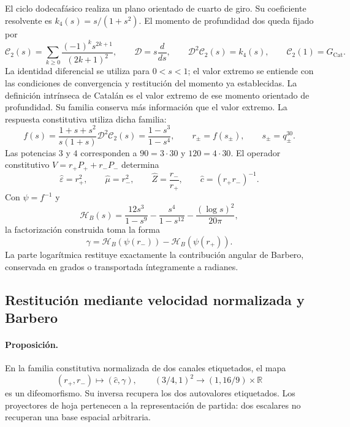 El ciclo dodecafásico realiza un plano orientado de cuarto de giro. Su
coeficiente resolvente es $k_4(s)=s/(1+s^2)$. El momento de profundidad dos
queda fijado por
\begin{equation}
 \mathcal C_2(s)=\sum_{k\geq0}
 \frac{(-1)^ks^{2k+1}}{(2k+1)^2},\qquad
 \mathcal D=s\frac{d}{ds},\qquad
 \mathcal D^2\mathcal C_2(s)=k_4(s),\qquad
 \mathcal C_2(1)=G_{\mathrm{Cat}}.
 \label{md:compos:momento-catalan}
\end{equation}
La identidad diferencial se utiliza para $0<s<1$; el valor extremo se
entiende con las condiciones de convergencia y restitución del momento ya
establecidas. La definición intrínseca de Catalán es el valor extremo de ese
momento orientado de profundidad. Su familia conserva más información que
el valor extremo. La respuesta constitutiva utiliza dicha familia:
\begin{equation}
 f(s)=\frac{1+s+s^2}{s(1+s)}\mathcal D^2\mathcal C_2(s)
 =\frac{1-s^3}{1-s^4},\qquad
 r_\pm=f(s_\pm),\qquad s_\pm=q_\pm^{30}.
 \label{md:compos:catalan-respuesta}
\end{equation}
Las potencias $3$ y $4$ corresponden a $90=3\cdot30$ y $120=4\cdot30$.
El operador constitutivo $V=r_+P_++r_-P_-$ determina
\begin{equation}
 \widehat\varepsilon=r_+^2,\qquad \widehat\mu=r_-^2,
 \qquad \widehat Z=\frac{r_-}{r_+},\qquad
 \widehat c=(r_+r_-)^{-1}.
 \label{md:compos:lectores-constitutivos}
\end{equation}
Con $\psi=f^{-1}$ y
\begin{equation}
 \mathcal H_B(s)=\frac{12s^3}{1-s^9}
 -\frac{s^4}{1-s^{12}}-\frac{(\log s)^2}{20\pi},
 \label{md:compos:h-barbero}
\end{equation}
la factorización construida toma la forma
\begin{equation}
 \gamma=\mathcal H_B(\psi(r_-))-\mathcal H_B(\psi(r_+)).
 \label{md:compos:factorizacion-barbero}
\end{equation}
La parte logarítmica restituye exactamente la contribución angular de
Barbero, conservada en grados o transportada íntegramente a radianes.

\subsection{Restitución mediante velocidad normalizada y Barbero}
\label{md:compos:difeomorfismo}

\paragraph{Proposición.}
En la familia constitutiva normalizada de dos canales etiquetados, el mapa
\begin{equation}
 (r_+,r_-)\longmapsto(\widehat c,\gamma),\qquad
 (3/4,1)^2\longrightarrow(1,16/9)\times\mathbb R
 \label{md:compos:mapa-global}
\end{equation}
es un difeomorfismo. Su inversa recupera los dos autovalores etiquetados.
Los proyectores de hoja pertenecen a la representación de partida: dos
escalares no recuperan una base espacial arbitraria.

